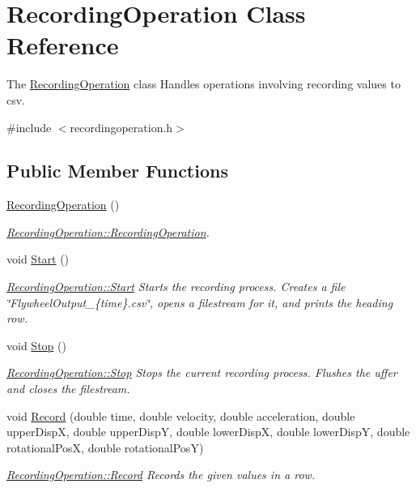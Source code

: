 \hypertarget{class_recording_operation}{}\section{Recording\+Operation Class Reference}
\label{class_recording_operation}


The \hyperlink{class_recording_operation}{Recording\+Operation} class Handles operations involving recording values to csv.  




{\ttfamily \#include $<$recordingoperation.\+h$>$}

\subsection*{Public Member Functions}
\begin{DoxyCompactItemize}
\item 
\hyperlink{class_recording_operation_a6335d0740c99799eb6cb094501019b07}{Recording\+Operation} ()
\begin{DoxyCompactList}\small\item\em \hyperlink{class_recording_operation_a6335d0740c99799eb6cb094501019b07}{Recording\+Operation\+::\+Recording\+Operation}. \end{DoxyCompactList}\item 
void \hyperlink{class_recording_operation_a9de73122788d5da0a2d747ae73df9bdf}{Start} ()
\begin{DoxyCompactList}\small\item\em \hyperlink{class_recording_operation_a9de73122788d5da0a2d747ae73df9bdf}{Recording\+Operation\+::\+Start} Starts the recording process. Creates a file \char`\"{}\+Flywheel\+Output\+\_\+\{time\}.\+csv\char`\"{}, opens a filestream for it, and prints the heading row. \end{DoxyCompactList}\item 
void \hyperlink{class_recording_operation_afa9953a7cdce60344d090eb95a4d0d13}{Stop} ()
\begin{DoxyCompactList}\small\item\em \hyperlink{class_recording_operation_afa9953a7cdce60344d090eb95a4d0d13}{Recording\+Operation\+::\+Stop} Stops the current recording process. Flushes the uffer and closes the filestream. \end{DoxyCompactList}\item 
void \hyperlink{class_recording_operation_a1a341c41178b05e95bc434510dfeedca}{Record} (double time, double velocity, double acceleration, double upper\+DispX, double upper\+DispY, double lower\+DispX, double lower\+DispY, double rotational\+PosX, double rotational\+PosY)
\begin{DoxyCompactList}\small\item\em \hyperlink{class_recording_operation_a1a341c41178b05e95bc434510dfeedca}{Recording\+Operation\+::\+Record} Records the given values in a row. \end{DoxyCompactList}\end{DoxyCompactItemize}


